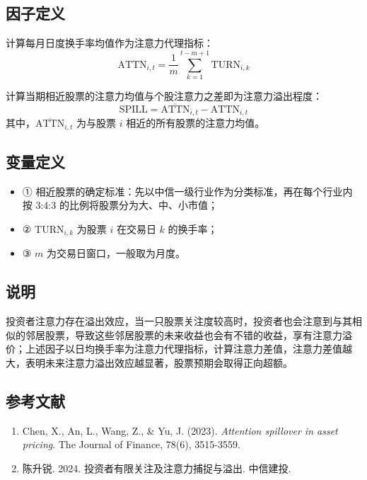 \documentclass{article}
\begin{document}
\subsection{因子定义}
计算每月日度换手率均值作为注意力代理指标：
\begin{equation}
    \mathrm{ATTN}_{i,t} = \frac{1}{m} \sum_{k=1}^{t-m+1} \mathrm{TURN}_{i,k}
\end{equation}

计算当期相近股票的注意力均值与个股注意力之差即为注意力溢出程度：
\begin{equation}
    \mathrm{SPILL} = \overline{\mathrm{ATTN}}_{i,t} - \mathrm{ATTN}_{i,t}
\end{equation}
其中，\(\overline{\mathrm{ATTN}}_{i,t}\) 为与股票 \( i \) 相近的所有股票的注意力均值。

\subsection{变量定义}
\begin{itemize}
    \item ① 相近股票的确定标准：先以中信一级行业作为分类标准，再在每个行业内按 3:4:3 的比例将股票分为大、中、小市值；
    \item ② \( \mathrm{TURN}_{i,k} \) 为股票 \( i \) 在交易日 \( k \) 的换手率；
    \item ③ \( m \) 为交易日窗口，一般取为月度。
\end{itemize}

\subsection{说明}
投资者注意力存在溢出效应，当一只股票关注度较高时，投资者也会注意到与其相似的邻居股票，导致这些邻居股票的未来收益也会有不错的收益，享有注意力溢价；上述因子以日均换手率为注意力代理指标，计算注意力差值，注意力差值越大，表明未来注意力溢出效应越显著，股票预期会取得正向超额。

\subsection{参考文献}
\begin{enumerate}
    \item Chen, X., An, L., Wang, Z., \& Yu, J. (2023). \textit{Attention spillover in asset pricing}. The Journal of Finance, 78(6), 3515-3559.
    \item 陈升锐. 2024. 投资者有限关注及注意力捕捉与溢出. 中信建投.
\end{enumerate}
\end{document}
